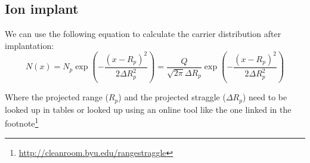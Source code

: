 \subsection{Ion implant}
We can use the following equation to calculate the carrier distribution after implantation:
\begin{equation}
N(x)
=
N_p \exp\left(-\frac{(x-R_p)^2}{2\Delta R_p^2}\right)
=
\frac{Q}{\sqrt{2\pi}\Delta R_p}\exp\left(-\frac{(x-R_p)^2}{2\Delta R_p^2}\right)
\end{equation}

Where the projected range ($R_p$) and the projected straggle ($\Delta R_p$) need to be looked up in tables or looked up using an online tool like the one linked in the footnote\footnote{\url{http://cleanroom.byu.edu/rangestraggle}}